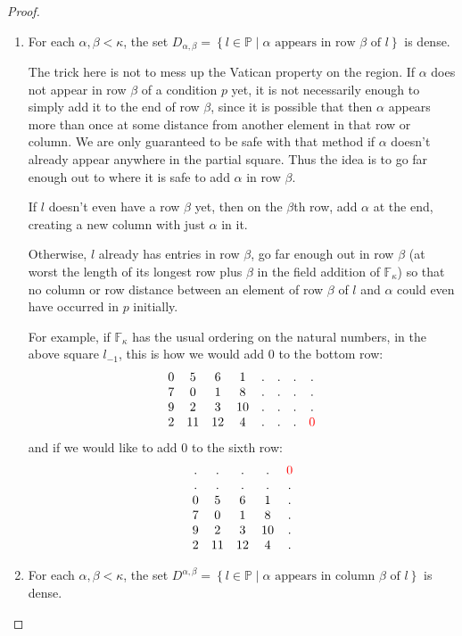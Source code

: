 \documentclass[12pt,a4paper]{article}
\newcommand{\F}{\mathbb{F}}
\newcommand{\st}{\; | \;}
\newcommand{\set}[2]{\left\{#1\st #2 \right\}}
\renewcommand{\P}{\mathbb{P}}
\begin{document}
\begin{proof}
\begin{enumerate}
	\item For each $\alpha, \beta <\kappa$, the set $D_{\alpha,\beta}=\set{l \in \P}{\alpha \text{ appears in row } \beta \text{ of } l}$ is dense.
	
	The trick here is not to mess up the Vatican property on the region. If $\alpha$ does not appear in row $\beta$ of a condition $p$ yet, it is not necessarily enough to simply add it to the end of row $\beta$, since it is possible that then $\alpha$ appears more than once at some distance from another element in that row or column. We are only guaranteed to be safe with that method if $\alpha$ doesn't already appear anywhere in the partial square. Thus the idea is to go far enough out to where it is safe to add $\alpha$ in row $\beta$.
	
	If $l$ doesn't even have a row $\beta$ yet, then on the $\beta$th row, add $\alpha$ at the end, creating a new column with just $\alpha$ in it.
	
	Otherwise, $l$ already has entries in row $\beta$, go far enough out in row $\beta$ (at worst the length of its longest row plus $\beta$ in the field addition of $\F_\kappa$) so that no column or row distance between an element of row $\beta$ of $l$ and $\alpha$ could even have occurred in $p$ initially.
	
	For example, if $\F_\kappa$ has the usual ordering on the natural numbers, in the above square $l_{-1}$, this is how we would add 0 to the bottom row:
$$\begin{array}{cccccccc}
	0 & 5 & 6 & 1 &.&.&.&.\\ 
	7 &  0 & 1 & 8 &.&.&.&. \\
	9 & 2 & 3 & 10&.&.&.&. \\
	2 & 11 & 12 & 4 & . & . & . & \color{red}0
\end{array}$$
and if we would like to add 0 to the sixth row:
$$\begin{array}{ccccccc}
	. & .& .& .& \color{red} 0\\
	. & . &. & . & .\\
	0 & 5 & 6 & 1 & .  \\ 
	7 &  0 & 1 & 8 & . \\
	9 & 2 & 3 & 10 & . \\
	2 & 11 & 12 & 4 & .
\end{array}$$

	
	\item For each $\alpha, \beta <\kappa$, the set $D^{\alpha,\beta}=\set{l \in \P}{\alpha \text{ appears in column } \beta \text{ of } l}$ is dense.
	

\end{enumerate}
\end{proof}
\end{document}
